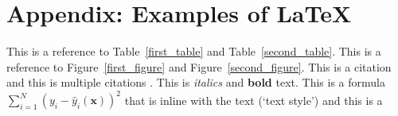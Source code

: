 \documentclass[10pt,twocolumn,letterpaper]{article}
\begin{document}
\section*{Appendix: Examples of \LaTeX}



This is a reference to Table~\ref{first_table} and Table~\ref{second_table}.
This is a reference to Figure~\ref{first_figure} and Figure~\ref{second_figure}.
This is a citation \cite{breiman2001statistical} and this is
multiple citations \cite{breiman2001statistical,bishop2006pattern}.
This is \textit{italics} and \textbf{bold} text.
This is a formula $\sum_{i=1}^N (y_i - \hat{y}_i(\mathbf{x}))^2$
that is inline with the text (`text style') and this is a
\end{document}
